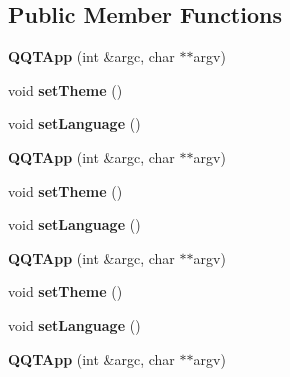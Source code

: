 \subsection*{Public Member Functions}
\begin{DoxyCompactItemize}
\item 
\mbox{\label{class_q_q_t_app_a5de976120554dc989d743a9b57f1ba8b}} 
{\bfseries Q\+Q\+T\+App} (int \&argc, char $\ast$$\ast$argv)
\item 
\mbox{\label{class_q_q_t_app_a1edf09c269743d1fba20d26cb6479632}} 
void {\bfseries set\+Theme} ()
\item 
\mbox{\label{class_q_q_t_app_a15aa8fac4b702bdfb2ea3e244e256e5a}} 
void {\bfseries set\+Language} ()
\item 
\mbox{\label{class_q_q_t_app_a5de976120554dc989d743a9b57f1ba8b}} 
{\bfseries Q\+Q\+T\+App} (int \&argc, char $\ast$$\ast$argv)
\item 
\mbox{\label{class_q_q_t_app_a1edf09c269743d1fba20d26cb6479632}} 
void {\bfseries set\+Theme} ()
\item 
\mbox{\label{class_q_q_t_app_a15aa8fac4b702bdfb2ea3e244e256e5a}} 
void {\bfseries set\+Language} ()
\item 
\mbox{\label{class_q_q_t_app_a5de976120554dc989d743a9b57f1ba8b}} 
{\bfseries Q\+Q\+T\+App} (int \&argc, char $\ast$$\ast$argv)
\item 
\mbox{\label{class_q_q_t_app_a1edf09c269743d1fba20d26cb6479632}} 
void {\bfseries set\+Theme} ()
\item 
\mbox{\label{class_q_q_t_app_a15aa8fac4b702bdfb2ea3e244e256e5a}} 
void {\bfseries set\+Language} ()
\item 
\mbox{\label{class_q_q_t_app_a5de976120554dc989d743a9b57f1ba8b}} 
{\bfseries Q\+Q\+T\+App} (int \&argc, char $\ast$$\ast$argv)
\item 
\mbox{\label{class_q_q_t_app_a1edf09c269743d1fba20d26cb6479632}} 

\end{DoxyCompactItemize}
